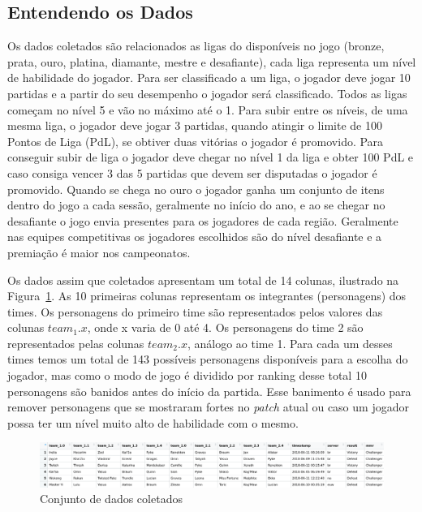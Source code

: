 \documentclass[a4paper]{article}
\begin{document}
\subsection{Entendendo os Dados}
Os dados coletados são relacionados as ligas do disponíveis no jogo (bronze, prata, ouro, platina, diamante, mestre e desafiante), cada liga representa um nível de habilidade do jogador. Para ser classificado a um liga, o jogador deve jogar 10 partidas e a partir do seu desempenho o jogador será classificado. Todos as ligas começam no nível 5 e vão no máximo até o 1. Para subir entre os níveis, de uma mesma liga, o jogador deve jogar 3 partidas, quando atingir o limite de 100 Pontos de Liga (PdL), se obtiver duas vitórias o jogador é promovido. Para conseguir subir de liga o jogador deve chegar no nível 1 da liga e obter 100 PdL e caso consiga vencer 3 das 5 partidas que devem ser disputadas o jogador é promovido. Quando se chega no ouro o jogador ganha um conjunto de itens dentro do jogo a cada sessão, geralmente no início do ano, e ao se chegar no desafiante o jogo envia presentes para os jogadores de cada região. Geralmente nas equipes competitivas os jogadores escolhidos são do nível desafiante e a premiação é maior nos campeonatos. 

Os dados assim que coletados apresentam um total de 14 colunas, ilustrado na Figura~\ref{fig:dataantes}. As 10 primeiras colunas representam os integrantes (personagens) dos times. Os personagens do primeiro time são representados pelos valores das colunas $team_1.x$, onde x varia de 0 até 4.  Os personagens do time 2 são representados pelas colunas $team_2.x$, análogo ao time 1. Para cada um desses times temos um total de 143 possíveis personagens disponíveis para a escolha do jogador, mas como o modo de jogo é dividido por ranking desse total 10 personagens são banidos antes do início da partida. Esse banimento é usado para remover personagens que se mostraram fortes no \textit{patch} atual ou caso um jogador possa ter um nível muito alto de habilidade com o mesmo.

\begin{figure}[ht]
\centering
\includegraphics[width=15cm]{imagens/data_before}
\caption{\label{fig:dataantes}Conjunto de dados coletados}
\end{figure}
\end{document}

